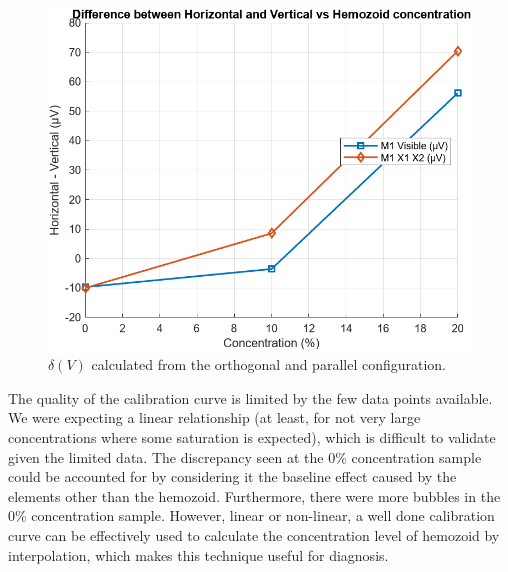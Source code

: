 \documentclass[12pt,a4paper]{article}
\begin{document}


\begin{figure} [H]
    \centering
    \includegraphics[width=0.6\linewidth]{figs/task6_concentration.png}
    \caption{$\delta(V)$ calculated from the orthogonal and parallel configuration.}
    \label{fig:t6}
\end{figure}

The quality of the calibration curve is limited by the few data points available. We were expecting a linear relationship (at least, for not very large concentrations where some saturation is expected), which is difficult to validate given the limited data. The discrepancy seen at the 0\% concentration sample could be accounted for by considering it the baseline effect caused by the elements other than the hemozoid. %
Furthermore, there were more bubbles in the 0\% concentration sample. However, linear or non-linear, a well done calibration curve can be effectively used to calculate the concentration level of hemozoid by interpolation, which makes this technique useful for diagnosis.


\end{document}
